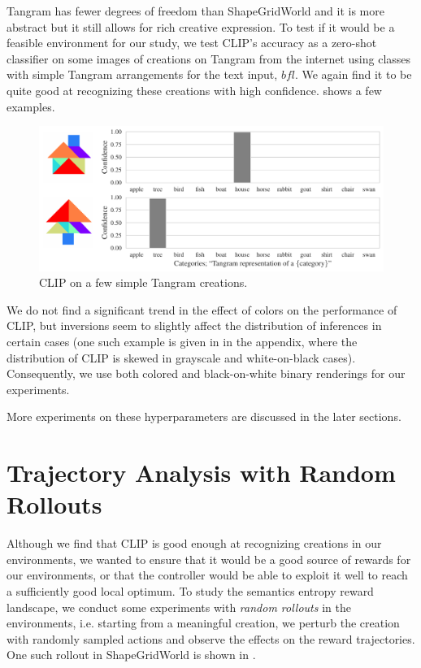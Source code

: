 Tangram has fewer degrees of freedom than ShapeGridWorld and it is more abstract but it still allows for rich creative expression.
To test if it would be a feasible environment for our study, we test CLIP's accuracy as a zero-shot classifier on some images of creations on Tangram from the internet using classes with simple Tangram arrangements for the text input, \(bfl\).
We again find it to be quite good at recognizing these creations with high confidence.
 shows a few examples.
\begin{figure}[h]
    \centering
    \includegraphics[width=\textwidth]{images/tangram_comparison_10.pdf}
    \caption{CLIP on a few simple Tangram creations.}
    \label{fig:clip-tangram}
\end{figure}

We do not find a significant trend in the effect of colors on the performance of CLIP, but inversions seem to slightly affect the distribution of inferences in certain cases
(one such example is given in  in the appendix, where the distribution of CLIP is skewed in grayscale and white-on-black cases).
Consequently, we use both colored and black-on-white binary renderings for our experiments.

More experiments on these hyperparameters are discussed in the later sections.


\section{Trajectory Analysis with Random Rollouts}
\label{sec:clip-problems}
Although we find that CLIP is good enough at recognizing creations in our environments, we wanted to ensure that it would be a good source of rewards for our environments, or that the controller would be able to exploit it well to reach a sufficiently good local optimum.
To study the semantics entropy reward landscape, we conduct some experiments with \emph{random rollouts} in the environments, i.e. starting from a meaningful creation, we perturb the creation with randomly sampled actions and observe the effects on the reward trajectories.
One such rollout in ShapeGridWorld is shown in .

